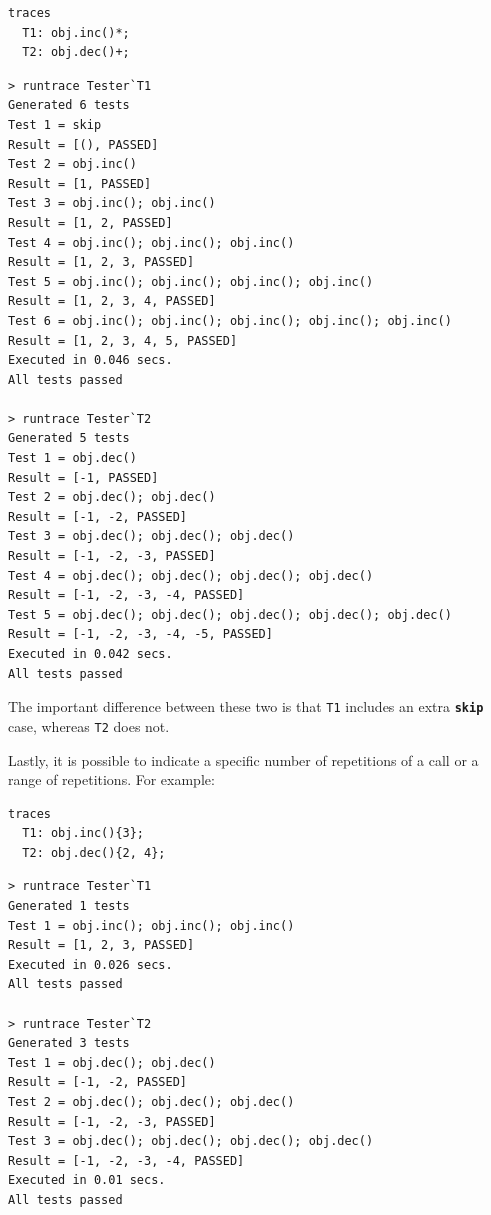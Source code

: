 \documentclass{overturerepchap}
\begin{document}
\small
\begin{lstlisting}
traces
  T1: obj.inc()*;
  T2: obj.dec()+;
\end{lstlisting}

\lstset{style=tool,language=}
\begin{lstlisting}[escapechar=@]
> runtrace Tester`T1
Generated 6 tests
Test 1 = skip
Result = [(), PASSED]
Test 2 = obj.inc()
Result = [1, PASSED]
Test 3 = obj.inc(); obj.inc()
Result = [1, 2, PASSED]
Test 4 = obj.inc(); obj.inc(); obj.inc()
Result = [1, 2, 3, PASSED]
Test 5 = obj.inc(); obj.inc(); obj.inc(); obj.inc()
Result = [1, 2, 3, 4, PASSED]
Test 6 = obj.inc(); obj.inc(); obj.inc(); obj.inc(); obj.inc()
Result = [1, 2, 3, 4, 5, PASSED]
Executed in 0.046 secs. 
All tests passed

> runtrace Tester`T2
Generated 5 tests
Test 1 = obj.dec()
Result = [-1, PASSED]
Test 2 = obj.dec(); obj.dec()
Result = [-1, -2, PASSED]
Test 3 = obj.dec(); obj.dec(); obj.dec()
Result = [-1, -2, -3, PASSED]
Test 4 = obj.dec(); obj.dec(); obj.dec(); obj.dec()
Result = [-1, -2, -3, -4, PASSED]
Test 5 = obj.dec(); obj.dec(); obj.dec(); obj.dec(); obj.dec()
Result = [-1, -2, -3, -4, -5, PASSED]
Executed in 0.042 secs. 
All tests passed
\end{lstlisting}
\lstset{style=mystyle}
\lstset{language=VDM++}
\normalsize

The important difference between these two is that \texttt{T1} includes an extra
\texttt{\textbf{skip}} case, whereas \texttt{T2} does not.

Lastly, it is possible to indicate a specific number of repetitions of a call or
a range of repetitions. For example:

\small
\begin{lstlisting}
traces
  T1: obj.inc(){3};
  T2: obj.dec(){2, 4};
\end{lstlisting}

\lstset{style=tool,language=}
\begin{lstlisting}[escapechar=@]
> runtrace Tester`T1
Generated 1 tests
Test 1 = obj.inc(); obj.inc(); obj.inc()
Result = [1, 2, 3, PASSED]
Executed in 0.026 secs. 
All tests passed

> runtrace Tester`T2
Generated 3 tests
Test 1 = obj.dec(); obj.dec()
Result = [-1, -2, PASSED]
Test 2 = obj.dec(); obj.dec(); obj.dec()
Result = [-1, -2, -3, PASSED]
Test 3 = obj.dec(); obj.dec(); obj.dec(); obj.dec()
Result = [-1, -2, -3, -4, PASSED]
Executed in 0.01 secs. 
All tests passed
\end{lstlisting}
\lstset{style=mystyle}
\lstset{language=VDM++}
\normalsize
\end{document}
